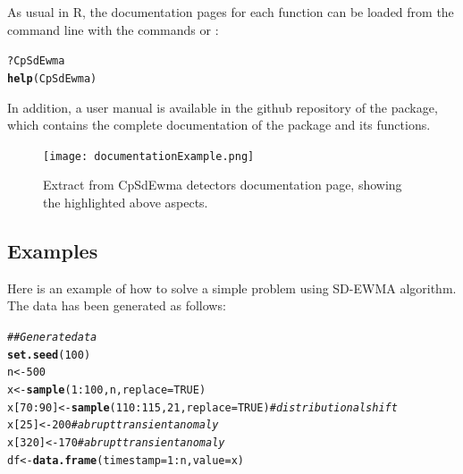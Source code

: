 \documentclass[a4paper]{article}\usepackage[]{graphicx}\usepackage[]{color}
\makeatletter
\newcommand{\hlnum}[1]{\textcolor[rgb]{0.686,0.059,0.569}{#1}}%
\newcommand{\hlcom}[1]{\textcolor[rgb]{0.678,0.584,0.686}{\textit{#1}}}%
\newcommand{\hlopt}[1]{\textcolor[rgb]{0,0,0}{#1}}%
\newcommand{\hlstd}[1]{\textcolor[rgb]{0.345,0.345,0.345}{#1}}%
\newcommand{\hlkwb}[1]{\textcolor[rgb]{0.69,0.353,0.396}{#1}}%
\newcommand{\hlkwc}[1]{\textcolor[rgb]{0.333,0.667,0.333}{#1}}%
\newcommand{\hlkwd}[1]{\textcolor[rgb]{0.737,0.353,0.396}{\textbf{#1}}}%
\newenvironment{kframe}{%
 \def\at@end@of@kframe{}%
 \ifinner\ifhmode%
  \def\at@end@of@kframe{\end{minipage}}%
  \begin{minipage}{\columnwidth}%
 \fi\fi%
 \def\FrameCommand##1{\hskip\@totalleftmargin \hskip-\fboxsep
 \colorbox{shadecolor}{##1}\hskip-\fboxsep
     \hskip-\linewidth \hskip-\@totalleftmargin \hskip\columnwidth}%
 \MakeFramed {\advance\hsize-\width
   \@totalleftmargin\z@ \linewidth\hsize
   \@setminipage}}%
 {\par\unskip\endMakeFramed%
 \at@end@of@kframe}
\newenvironment{knitrout}{}{} %
\makeatother
\begin{document}
As usual in R, the documentation pages for each function can be loaded from the command line with the commands  or :

\begin{knitrout}
\color{fgcolor}\begin{kframe}
\begin{alltt}
\hlopt{?}\hlstd{CpSdEwma}
\hlkwd{help}\hlstd{(CpSdEwma)}
\end{alltt}
\end{kframe}
\end{knitrout}

In addition, a user manual is available in the github repository of the   package, which contains the complete documentation of the package and its functions.

\begin{figure}[htbp]
\centering
\texttt{[image: documentationExample.png]}
\caption{Extract from CpSdEwma detectors documentation page, showing the highlighted above aspects.}
\label{fig:documentation}
\end{figure}

\newpage

\subsection{Examples}\label{sec:examples}

Here is an example of how to solve a simple problem using SD-EWMA algorithm. The data has been generated as follows:

\begin{knitrout}
\color{fgcolor}\begin{kframe}
\begin{alltt}
\hlcom{## Generate data}
\hlkwd{set.seed}\hlstd{(}\hlnum{100}\hlstd{)}
\hlstd{n} \hlkwb{<-} \hlnum{500}
\hlstd{x} \hlkwb{<-} \hlkwd{sample}\hlstd{(}\hlnum{1}\hlopt{:}\hlnum{100}\hlstd{, n,} \hlkwc{replace} \hlstd{=} \hlnum{TRUE}\hlstd{)}
\hlstd{x[}\hlnum{70}\hlopt{:}\hlnum{90}\hlstd{]} \hlkwb{<-} \hlkwd{sample}\hlstd{(}\hlnum{110}\hlopt{:}\hlnum{115}\hlstd{,} \hlnum{21}\hlstd{,} \hlkwc{replace} \hlstd{=} \hlnum{TRUE}\hlstd{)} \hlcom{# distributional shift}
\hlstd{x[}\hlnum{25}\hlstd{]} \hlkwb{<-} \hlnum{200} \hlcom{# abrupt transient anomaly}
\hlstd{x[}\hlnum{320}\hlstd{]} \hlkwb{<-} \hlnum{170} \hlcom{# abrupt transient anomaly}
\hlstd{df} \hlkwb{<-} \hlkwd{data.frame}\hlstd{(}\hlkwc{timestamp} \hlstd{=} \hlnum{1}\hlopt{:}\hlstd{n,} \hlkwc{value} \hlstd{= x)}
\end{alltt}
\end{kframe}
\end{knitrout}
\end{document}
